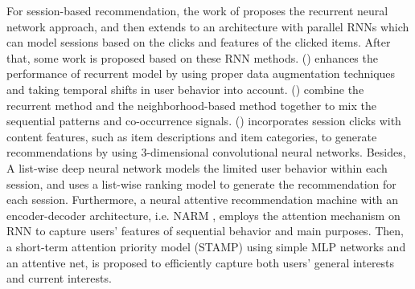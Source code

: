 \documentclass[letterpaper]{article} \usepackage{cite}
\begin{document}
For session-based recommendation, the work of \cite{DBLP:journals/corr/HidasiKBT15} proposes the recurrent neural network approach, and then extends to an architecture with parallel RNNs \cite{Hidasi:2016:PRN:2959100.2959167} which can model sessions based on the clicks and features of the clicked items. After that, some work is proposed based on these RNN methods. \citeauthor{Tan:2016:IRN:2988450.2988452} (\citeyear{Tan:2016:IRN:2988450.2988452}) enhances the performance of recurrent model by using proper data augmentation techniques and taking temporal shifts in user behavior into account. \citeauthor{Jannach:2017:RNN:3109859.3109872} (\citeyear{Jannach:2017:RNN:3109859.3109872}) combine the recurrent method and the neighborhood-based method together to mix the sequential patterns and co-occurrence signals. \citeauthor{Tuan:2017:CNS:3109859.3109900} (\citeyear{Tuan:2017:CNS:3109859.3109900}) incorporates session clicks with content features, such as item descriptions and item categories, to generate recommendations by using 3-dimensional convolutional neural networks. Besides, A list-wise deep neural network \cite{Wu:2017:SIE:3132847.3133163} models the limited user behavior within each session, and uses a list-wise ranking model to generate the recommendation for each session. Furthermore, a neural attentive recommendation machine with an encoder-decoder architecture, i.e. NARM \cite{Li:2017:NAS:3132847.3132926}, employs the attention mechanism on RNN to capture users' features of sequential behavior and main purposes. Then, a short-term attention priority model (STAMP) \cite{Liu:2018:SSA:3219819.3219950} using simple MLP networks and an attentive net, is proposed to efficiently capture both users' general interests and current interests.
\end{document}
